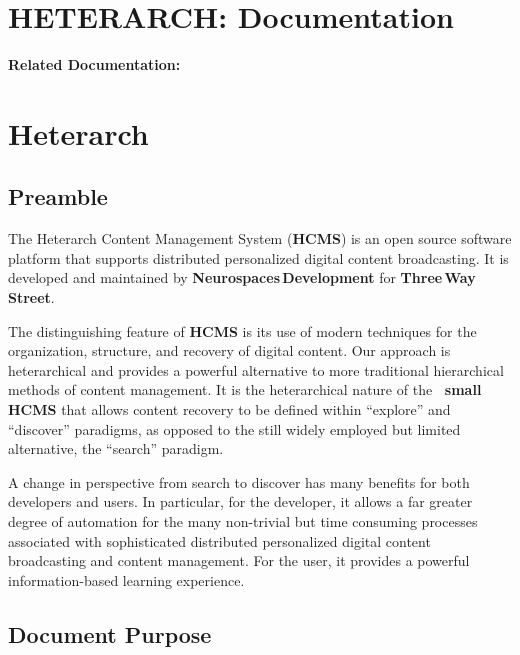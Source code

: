 \documentclass[12pt]{article}
\begin{document}
\section*{HETERARCH: Documentation}

{\bf Related Documentation:}

\section*{Heterarch}

\subsection*{Preamble}

The Heterarch Content Management System ({\bf \small HCMS}) is an open source software platform that supports distributed personalized digital content broadcasting. It is developed and maintained by {\bf Neurospaces\,Development} for {\bf Three\,Way\,Street}. 


The distinguishing feature of {\bf \small HCMS} is its use of modern techniques for the organization, structure, and recovery of digital content. Our approach is heterarchical and provides a powerful alternative to more traditional hierarchical methods of content management. It is the heterarchical nature of the {\bf \ small HCMS} that allows content recovery to be defined within ``explore'' and ``discover'' paradigms, as opposed to the still widely employed but limited alternative, the ``search'' paradigm.

A change in perspective from search to discover has many benefits for both developers and users. In particular, for the developer, it allows a far greater degree of automation for the many non-trivial but time consuming processes associated with sophisticated distributed personalized digital content broadcasting and content management. For the user, it provides a powerful information-based learning experience.

\subsection*{Document Purpose}
\end{document}
